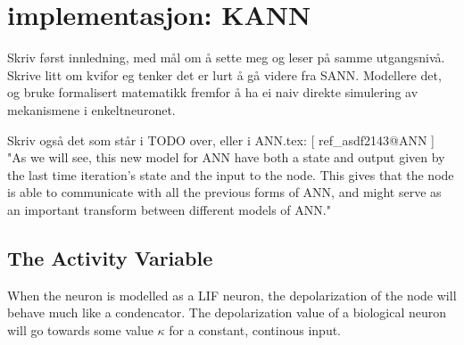 %



\section{implementasjon: KANN}
	

	Skriv først innledning, med mål om å sette meg og leser på samme utgangsnivå.
	Skrive litt om kvifor eg tenker det er lurt å gå videre fra SANN.
	Modellere det, og bruke formalisert matematikk fremfor å ha ei naiv direkte simulering av mekanismene i enkeltneuronet.

	Skriv også det som står i TODO over, eller i ANN.tex: [ ref\_asdf2143@ANN ]%
	"As we will see, this new model for ANN have both a state and output given by the last time iteration's state and the input to the node. 
	This gives that the node is able to communicate with all the previous forms of ANN, and might serve as an important transform between different models of ANN."

 		\subsection{The Activity Variable} %
	When the neuron is modelled as a LIF neuron, the depolarization of the node will behave much like a condencator. 
	The depolarization value of a biological neuron will go towards some value $\kappa$ for a constant, continous input.

